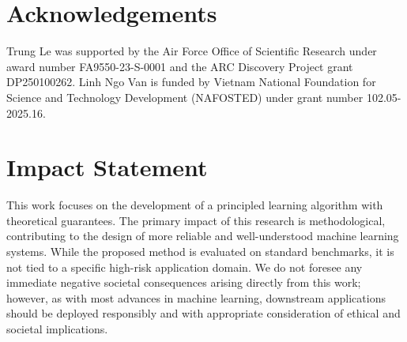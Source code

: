 \documentclass{article}
\theoremstyle{plain}
\theoremstyle{definition}
\theoremstyle{remark}
\begin{document}
\section*{Acknowledgements}
Trung Le was supported by the Air Force Office of Scientific Research under award number FA9550-23-S-0001 and the ARC Discovery Project grant DP250100262. Linh Ngo Van is funded by Vietnam National Foundation for Science and Technology
Development (NAFOSTED) under grant number 102.05-2025.16.

\section*{Impact Statement}
This work focuses on the development of a principled learning algorithm with theoretical guarantees. The primary impact of this research is methodological, contributing to the design of more reliable and well-understood machine learning systems. While the proposed method is evaluated on standard benchmarks, it is not tied to a specific high-risk application domain. We do not foresee any immediate negative societal consequences arising directly from this work; however, as with most advances in machine learning, downstream applications should be deployed responsibly and with appropriate consideration of ethical and societal implications.

\nocite{langley00}




\newpage
\appendix
\onecolumn
\end{document}
